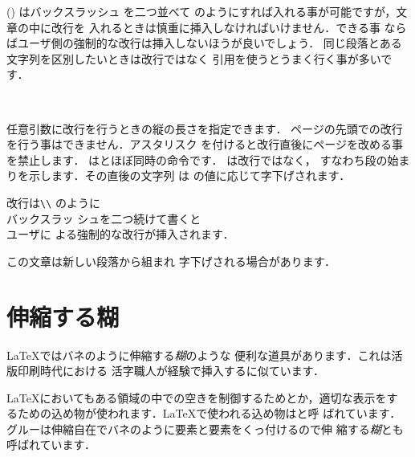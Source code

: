 () はバックスラッシュ\qu{\texttt\bs}%
を二つ並べて\qu{\texttt{\bs\bs}}
のようにすれば入れる事が可能ですが，文章の中に改行を
入れるときは慎重に挿入しなければいけません．できる事
ならばユーザ側の強制的な改行は挿入しないほうが良いでしょう．
同じ段落とある文字列を区別したいときは改行ではなく
引用を使うとうまく行く事が多いです．
\begin{usage}
\\[$\<長さ>$] 
\newline
\par
\end{usage}
任意引数に改行を行うときの縦の長さを指定できます．
ページの先頭での改行を行う事はできません．アスタリスク
を付けると改行直後にページを改める事を禁止します．
   は\qu{\texttt{\bs\bs}}とほぼ同時の命令です．
   は改行ではなく，
すなわち段の始まりを示します．その直後の文字列
は  の値に応じて字下げされます．
\begin{inout}
改行は\verb|\\| のように\\バックスラッ
シュを二つ続けて書くと\\[1cm]ユーザに
よる強制的な改行が挿入されます．\par
この文章は新しい段落から組まれ
\newline 字下げされる場合があります．
\end{inout}





\section{伸縮する糊}

{\LaTeX}ではバネのように伸縮する\emph{糊}のような
便利な道具があります．これは活版印刷時代における
活字職人が経験で挿入するに似ています．

{\LaTeX}においてもある領域の中での空きを制御するためとか，適切な表示をす
るための込め物が使われます．{\LaTeX}で使われる込め物は{}と呼
ばれています．グルーは伸縮自在でバネのように要素と要素をくっ付けるので伸
縮する\emph{糊}とも呼ばれています．

